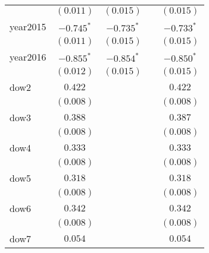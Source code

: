 \begin{center}
\begin{longtable}{l c c c c}
                         & $(0.011)$             & $(0.015)$             &                       & $(0.015)$             \\
year2015                 & $\mathbf{-0.745}^{*}$ & $\mathbf{-0.735}^{*}$ &                       & $\mathbf{-0.733}^{*}$ \\
                         & $(0.011)$             & $(0.015)$             &                       & $(0.015)$             \\
year2016                 & $\mathbf{-0.855}^{*}$ & $\mathbf{-0.854}^{*}$ &                       & $\mathbf{-0.850}^{*}$ \\
                         & $(0.012)$             & $(0.015)$             &                       & $(0.015)$             \\
dow2                     & $0.422$               &                       &                       & $0.422$               \\
                         & $(0.008)$             &                       &                       & $(0.008)$             \\
dow3                     & $0.388$               &                       &                       & $0.387$               \\
                         & $(0.008)$             &                       &                       & $(0.008)$             \\
dow4                     & $0.333$               &                       &                       & $0.333$               \\
                         & $(0.008)$             &                       &                       & $(0.008)$             \\
dow5                     & $0.318$               &                       &                       & $0.318$               \\
                         & $(0.008)$             &                       &                       & $(0.008)$             \\
dow6                     & $0.342$               &                       &                       & $0.342$               \\
                         & $(0.008)$             &                       &                       & $(0.008)$             \\
dow7                     & $0.054$               &                       &                       & $0.054$               \\

\end{longtable}
\end{center}

